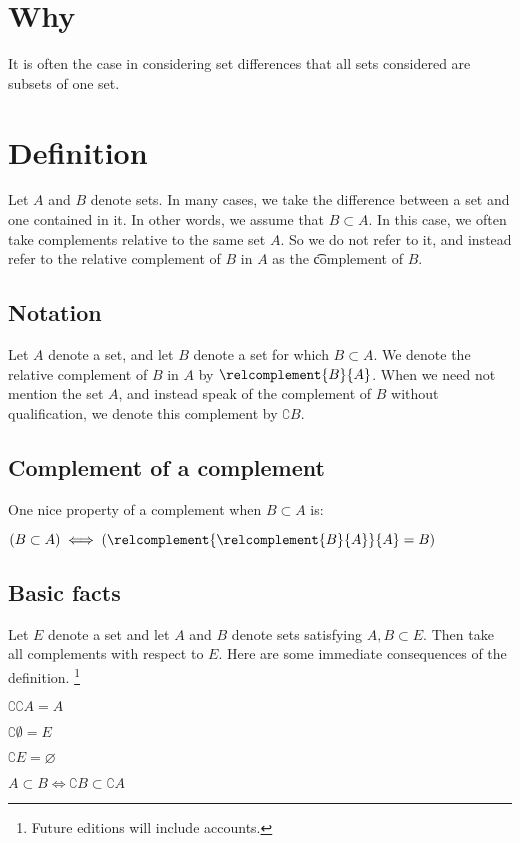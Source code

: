 
\section*{Why}

It is often the case in considering set differences that all sets considered are subsets of one set.

\section*{Definition}

Let $A$ and $B$ denote sets.
In many cases, we take the difference between a set and one contained in it.
In other words, we assume that $B \subset A$.
In this case, we often take complements relative to the same set $A$.
So we do not refer to it, and instead refer to the relative complement of $B$ in $A$ as the \t{complement} of $B$.

\subsection*{Notation}

Let $A$ denote a set, and let $B$ denote a set for which $B \subset A$.
We denote the relative complement of $B$ in $A$ by $\relcomplement{B}{A}$.
When we need not mention the set $A$, and instead speak of the complement of $B$ without qualification, we denote this complement by $\complement{B}$.

\subsection*{Complement of a complement}

One nice property of a complement when $B \subset A$ is:
\begin{proposition}$(B \subset A) \iff (\relcomplement{\relcomplement{B}{A}}{A} = B)$\end{proposition}

\subsection*{Basic facts}

Let $E$ denote a set and let $A$ and $B$ denote sets satisfying $A,B \subset E$.
Then take all complements with respect to $E$.
Here are some immediate consequences of the definition.
  \ifhmode\unskip\fi\footnote{
Future editions will include accounts.
  }

\begin{proposition}$\complement{\complement{A}} = A$\end{proposition}
\begin{proposition}$\complement{\emptyset} = E$\end{proposition}
\begin{proposition}$\complement{E} = \varnothing$\end{proposition}
\begin{proposition}$A \subset B \iff \complement{B} \subset \complement{A}$\end{proposition}